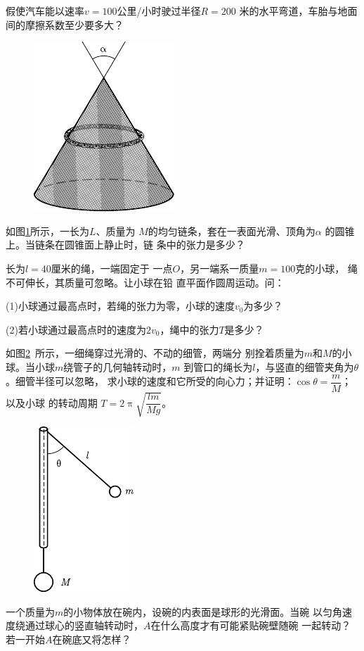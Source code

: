 \begin{exercises}
\exercise 假使汽车能以速率$  v = 1 0 0  $公里/小时驶过半径$  R = 2 0 0  $
米的水平弯道，车胎与地面间的摩擦系数至少要多大？

\begin{figure}
	\centering
	\includegraphics{figure/fig03.33}
	\caption{}
	\label{fig:03.33}
\end{figure}
\exercise 如图\ref{fig:03.33}所示，一长为$ L $、质量为
$ M $的均匀链条，套在一表面光滑、顶角为$ \alpha $
的圆锥上。当链条在圆锥面上静止时，链
条中的张力是多少？

\exercise 长为$  l = 4 0  $厘米的绳，一端固定于
一点$ O $，另一端系一质量$  m = 1 0 0  $克的小球，
绳不可伸长，其质量可忽略。让小球在铅
直平面作圆周运动。问：

(1)小球通过最高点时，若绳的张力为零，小球的速度$  v _ { 0 }  $为多少？

(2)若小球通过最高点时的速度为$  2 v _ { 0 }  $，绳中的张力$ T $是多少？

\exercise 如图\ref{fig:03.34}~所示，一细绳穿过光滑的、不动的细管，两端分
别拴着质量为$ m $和$ M $的小球。当小球$ m $绕管子的几何轴转动时，$ m $
到管口的绳长为$ l $，与竖直的细管夹角为$ \theta $。细管半径可以忽略，
求小球的速度和它所受的向心力；并证明：$  \cos \theta = \dfrac { m } { M }  $； 以及小球
的转动周期
$ T = 2 \uppi \sqrt{\dfrac { l m } { M g }}  $。

\begin{figure}
	\centering
	\includegraphics{figure/fig03.34}
	\caption{}
	\label{fig:03.34}
\end{figure}
\exercise 一个质量为$ m $的小物体放在碗内，设碗的内表面是球形的光滑面。当碗
以匀角速度绕通过球心的竖直轴转动时，$ A $在什么高度才有可能紧贴碗壁随碗
一起转动？若一开始$ A $在碗底又将怎样？


\end{exercises}
